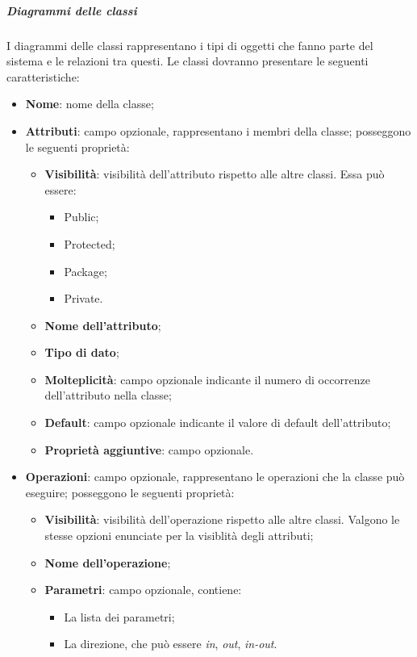 \documentclass[../norme-di-progetto.tex]{subfiles}
\begin{document}

\subparagraph*{Diagrammi delle classi}
I diagrammi delle classi rappresentano i tipi di oggetti che fanno parte del sistema e le relazioni tra questi. Le classi dovranno presentare le seguenti caratteristiche:
\begin{itemize}
  \item \textbf{Nome}: nome della classe;
  \item \textbf{Attributi}: campo opzionale, rappresentano i membri della classe; posseggono le seguenti proprietà:
    \begin{itemize}
      \item \textbf{Visibilità}: visibilità dell'attributo rispetto alle altre classi. Essa può essere:
      \begin{itemize}
        \item Public;
        \item Protected;
        \item Package;
        \item Private.
      \end{itemize}
      \item \textbf{Nome dell'attributo};
      \item \textbf{Tipo di dato};
      \item \textbf{Molteplicità}: campo opzionale indicante il numero di occorrenze dell'attributo nella classe;
      \item \textbf{Default}: campo opzionale indicante il valore di default dell'attributo;
      \item \textbf{Proprietà aggiuntive}: campo opzionale.
    \end{itemize}
    \item \textbf{Operazioni}: campo opzionale, rappresentano le operazioni che la classe può eseguire; posseggono le seguenti proprietà:
    \begin{itemize}
      \item \textbf{Visibilità}: visibilità dell'operazione rispetto alle altre classi. Valgono le stesse opzioni enunciate per la visiblità degli attributi;
      \item \textbf{Nome dell'operazione};
      \item \textbf{Parametri}: campo opzionale, contiene:
      \begin{itemize}
        \item La lista dei parametri;
        \item La direzione, che può essere \textit{in}, \textit{out}, \textit{in-out}.

\end{itemize}
\end{itemize}
\end{itemize}
\end{document}
